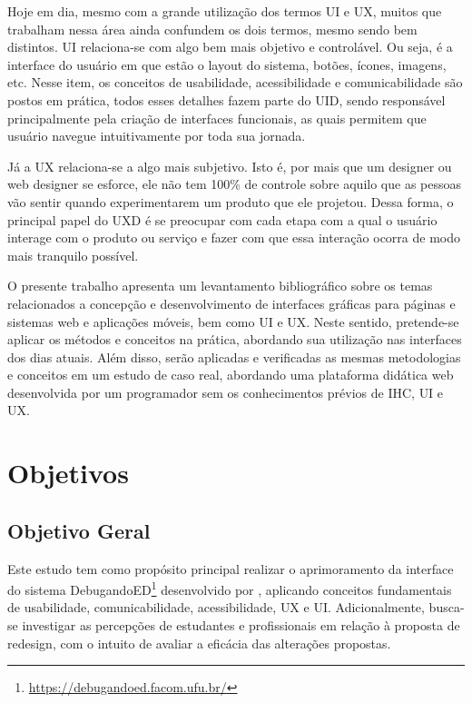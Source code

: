 Hoje em dia, mesmo com a grande utilização dos termos \ac{UI} e \ac{UX}, muitos que trabalham nessa área ainda confundem os dois termos, mesmo sendo bem distintos. \acf{UI} relaciona-se com algo bem mais objetivo e controlável. Ou seja, é a interface do usuário em que estão o layout do sistema, botões, ícones, imagens, etc. Nesse item, os conceitos de usabilidade, acessibilidade e comunicabilidade são postos em prática, todos esses detalhes fazem parte do \ac{UID}, sendo responsável principalmente pela criação de interfaces funcionais, as quais permitem que usuário navegue intuitivamente por toda sua jornada. 

Já a \acf{UX} relaciona-se a algo mais subjetivo. Isto é, por mais que um designer ou web designer se esforce, ele não tem 100\% de controle sobre aquilo que as pessoas vão sentir quando experimentarem um produto que ele projetou. Dessa forma, o principal papel do \ac{UXD} é se preocupar com cada etapa com a qual o usuário interage com o produto ou serviço e fazer com que essa interação ocorra de modo mais tranquilo possível.

O presente trabalho apresenta um levantamento bibliográfico sobre os temas relacionados a concepção e desenvolvimento de interfaces gráficas para páginas e sistemas web e aplicações móveis, bem como \acs{UI} e \acs{UX}. Neste sentido, pretende-se aplicar os métodos e conceitos na prática, abordando sua utilização nas interfaces dos dias atuais. Além disso, serão aplicadas e verificadas as mesmas metodologias e conceitos em um estudo de caso real, abordando uma plataforma didática web desenvolvida por um programador sem os conhecimentos prévios de \acs{IHC}, \acs{UI} e \acs{UX}.


\section{Objetivos}

\subsection{Objetivo Geral}
Este estudo tem como propósito principal realizar o aprimoramento da interface do sistema DebugandoED\footnote{\url{https://debugandoed.facom.ufu.br/}} desenvolvido por , aplicando conceitos fundamentais de usabilidade, comunicabilidade, acessibilidade, \ac{UX} e \ac{UI}. Adicionalmente, busca-se investigar as percepções de estudantes e profissionais em relação à proposta de redesign, com o intuito de avaliar a eficácia das alterações propostas.

